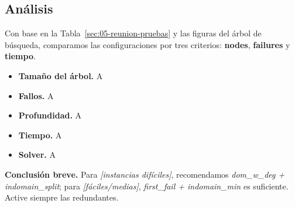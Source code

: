 
\subsection{Análisis}\label{sec:05-reunion-analisis}
Con base en la Tabla~\ref{sec:05-reunion-pruebas} y las figuras del árbol de búsqueda, comparamos las configuraciones por tres criterios: \textbf{nodes}, \textbf{failures} y \textbf{tiempo}.

\begin{itemize}
  \item \textbf{Tamaño del árbol.} A
  \item \textbf{Fallos.} A
  \item \textbf{Profundidad.} A
  \item \textbf{Tiempo.} A
  \item \textbf{Solver.} A
\end{itemize}

\noindent \textbf{Conclusión breve.} Para \textit{[instancias difíciles]}, recomendamos \textit{dom\_w\_deg + indomain\_split}; para \textit{[fáciles/medias]}, \textit{first\_fail + indomain\_min} es suficiente. Active siempre las redundantes.

